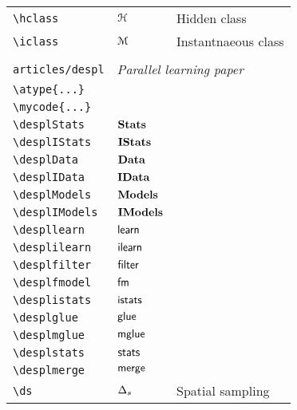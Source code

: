 \begin{longtable}{lll}
 {\color[rgb]{0.5,0.5,0.5}\texttt{\textbackslash hclass}} & $\mathcal{H}$ &  Hidden class\\ 
 {\color[rgb]{0.5,0.5,0.5}\texttt{\textbackslash iclass}} & $\mathcal{M}$ &  Instantnaeous class\\ 
  &  & \\ 
 {\color[rgb]{0.5,0.5,0.5}\texttt{articles/despl}} & \multicolumn{2}{l}{\emph{Parallel learning paper}}\\ 
 \hline
{\color[rgb]{0.5,0.5,0.5}\texttt{\textbackslash atype\{...\}}} &  & \\ 
 {\color[rgb]{0.5,0.5,0.5}\texttt{\textbackslash mycode\{...\}}} &  & \\ 
 {\color[rgb]{0.5,0.5,0.5}\texttt{\textbackslash desplStats}} & $\mathsf{\bf Stats }$ & \\ 
 {\color[rgb]{0.5,0.5,0.5}\texttt{\textbackslash desplIStats}} & $\mathsf{\bf IStats }$ & \\ 
 {\color[rgb]{0.5,0.5,0.5}\texttt{\textbackslash desplData}} & $\mathsf{\bf Data }$ & \\ 
 {\color[rgb]{0.5,0.5,0.5}\texttt{\textbackslash desplIData}} & $\mathsf{\bf IData }$ & \\ 
 {\color[rgb]{0.5,0.5,0.5}\texttt{\textbackslash desplModels}} & $\mathsf{\bf Models }$ & \\ 
 {\color[rgb]{0.5,0.5,0.5}\texttt{\textbackslash desplIModels}} & $\mathsf{\bf IModels }$ & \\ 
 {\color[rgb]{0.5,0.5,0.5}\texttt{\textbackslash despllearn}} & $\mathsf{learn}$ & \\ 
 {\color[rgb]{0.5,0.5,0.5}\texttt{\textbackslash desplilearn}} & $\mathsf{ilearn}$ & \\ 
 {\color[rgb]{0.5,0.5,0.5}\texttt{\textbackslash desplfilter}} & $\mathsf{filter}$ & \\ 
 {\color[rgb]{0.5,0.5,0.5}\texttt{\textbackslash desplfmodel}} & $\mathsf{fm}$ & \\ 
 {\color[rgb]{0.5,0.5,0.5}\texttt{\textbackslash desplistats}} & $\mathsf{istats}$ & \\ 
 {\color[rgb]{0.5,0.5,0.5}\texttt{\textbackslash desplglue}} & $\mathsf{glue}$ & \\ 
 {\color[rgb]{0.5,0.5,0.5}\texttt{\textbackslash desplmglue}} & $\mathsf{mglue}$ & \\ 
 {\color[rgb]{0.5,0.5,0.5}\texttt{\textbackslash desplstats}} & $\mathsf{stats}$ & \\ 
 {\color[rgb]{0.5,0.5,0.5}\texttt{\textbackslash desplmerge}} & $\mathsf{merge}$ & \\ 
 {\color[rgb]{0.5,0.5,0.5}\texttt{\textbackslash ds}} & $\Delta_s$ &  Spatial sampling\\ 

\end{longtable}

